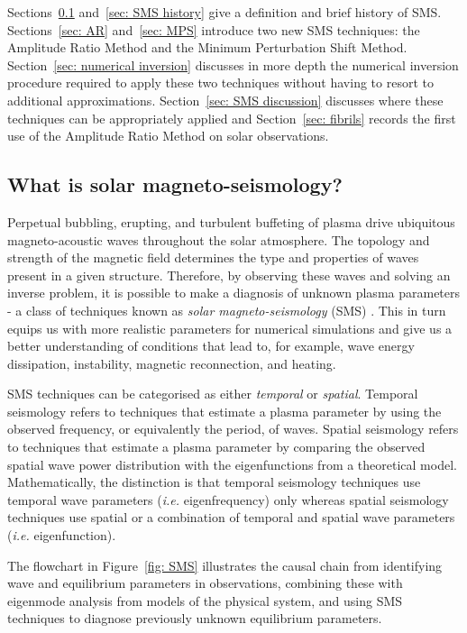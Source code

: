 \documentclass[12pt]{../style-files/ociamthesis}
\begin{document}
Sections~\ref{sec: what is SMS} and~\ref{sec: SMS history} give a definition and brief history of SMS. Sections~\ref{sec: AR} and~\ref{sec: MPS} introduce two new SMS techniques: the Amplitude Ratio Method and the Minimum Perturbation Shift Method. Section~\ref{sec: numerical inversion} discusses in more depth the numerical inversion procedure required to apply these two techniques without having to resort to additional approximations. Section~\ref{sec: SMS discussion} discusses where these techniques can be appropriately applied and Section~\ref{sec: fibrils} records the first use of the Amplitude Ratio Method on solar observations.


\subsection{What is solar magneto-seismology?} \label{sec: what is SMS}

Perpetual bubbling, erupting, and turbulent buffeting of plasma drive ubiquitous magneto-acoustic waves throughout the solar atmosphere. The topology and strength of the magnetic field determines the type and properties of waves present in a given structure. Therefore, by observing these waves and solving an inverse problem, it is possible to make a diagnosis of unknown plasma parameters - a class of techniques known as \textit{solar magneto-seismology} (SMS) \citep{and_etal09,arr12,dem_etal12}. This in turn equips us with more realistic parameters for numerical simulations and give us a better understanding of conditions that lead to, for example, wave energy dissipation, instability, magnetic reconnection, and heating.

SMS techniques can be categorised as either \textit{temporal} or \textit{spatial}. Temporal seismology refers to techniques that estimate a plasma parameter by using the observed frequency, or equivalently the period, of waves. Spatial seismology refers to techniques that estimate a plasma parameter by comparing the observed spatial wave power distribution with the eigenfunctions from a theoretical model. Mathematically, the distinction is that temporal seismology techniques use temporal wave parameters (\textit{i.e.} eigenfrequency) only whereas spatial seismology techniques use spatial or a combination of temporal and spatial wave parameters (\textit{i.e.} eigenfunction).

The flowchart in Figure~\ref{fig: SMS} illustrates the causal chain from identifying wave and equilibrium parameters in observations, combining these with eigenmode analysis from models of the physical system, and using SMS techniques to diagnose previously unknown equilibrium parameters.
\end{document}
